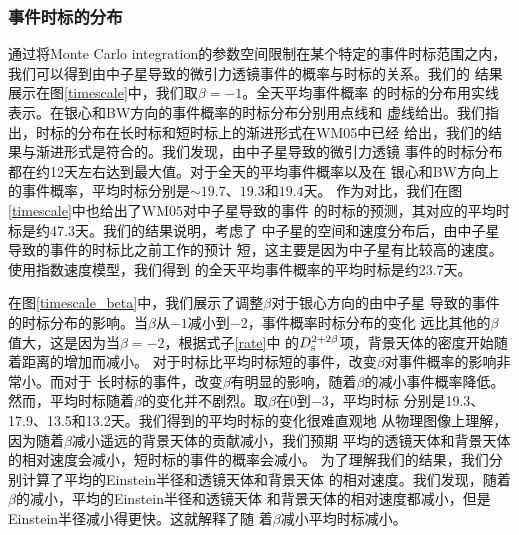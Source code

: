 \subsubsection{事件时标的分布}

通过将Monte Carlo integration的参数空间限制在某个特定的事件时标范围之内，
我们可以得到由中子星导致的微引力透镜事件的概率与时标的关系。我们的
结果展示在图\ref{timescale}中，我们取$\beta=-1$。全天平均事件概率
的时标的分布用实线表示。在银心和BW方向的事件概率的时标分布分别用点线和
虚线给出。我们指出，时标的分布在长时标和短时标上的渐进形式在WM05中已经
给出，我们的结果与渐进形式是符合的。我们发现，由中子星导致的微引力透镜
事件的时标分布都在约12天左右达到最大值。对于全天的平均事件概率以及在
银心和BW方向上的事件概率，平均时标分别是$\sim19.7$、$19.3$和$19.4$天。
作为对比，我们在图\ref{timescale}中也给出了WM05对中子星导致的事件
的时标的预测，其对应的平均时标是约47.3天。我们的结果说明，考虑了
中子星的空间和速度分布后，由中子星导致的事件的时标比之前工作的预计
短，这主要是因为中子星有比较高的速度。使用指数速度模型，我们得到
的全天平均事件概率的平均时标是约23.7天。

在图\ref{timescale_beta}中，我们展示了调整$\beta$对于银心方向的由中子星
导致的事件的时标分布的影响。当$\beta$从$-1$减小到$-2$，事件概率时标分布的变化
远比其他的$\beta$值大，这是因为当$\beta=-2$，根据式子\ref{rate}中
的$D_{\rm{s}}^{2+2\beta}$项，背景天体的密度开始随着距离的增加而减小。
对于时标比平均时标短的事件，改变$\beta$对事件概率的影响非常小。而对于
长时标的事件，改变$\beta$有明显的影响，随着$\beta$的减小事件概率降低。
然而，平均时标随着$\beta$的变化并不剧烈。取$\beta$在0到$-3$，平均时标
分别是19.3、17.9、13.5和13.2天。我们得到的平均时标的变化很难直观地
从物理图像上理解，因为随着$\beta$减小遥远的背景天体的贡献减小，我们预期
平均的透镜天体和背景天体的相对速度会减小，短时标的事件的概率会减小。
为了理解我们的结果，我们分别计算了平均的Einstein半径和透镜天体和背景天体
的相对速度。我们发现，随着$\beta$的减小，平均的Einstein半径和透镜天体
和背景天体的相对速度都减小，但是Einstein半径减小得更快。这就解释了随
着$\beta$减小平均时标减小。

